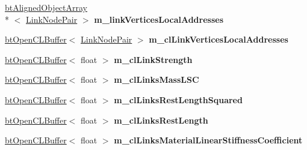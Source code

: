 \begin{DoxyCompactItemize}
\item 
\hypertarget{classbt_soft_body_link_data_open_c_l_s_i_m_d_aware_a5eb1278822cf10066651d3a363e18610}{\hyperlink{classbt_aligned_object_array}{bt\+Aligned\+Object\+Array}\\*
$<$ \hyperlink{classbt_soft_body_link_data_1_1_link_node_pair}{Link\+Node\+Pair} $>$ {\bfseries m\+\_\+link\+Vertices\+Local\+Addresses}}\label{classbt_soft_body_link_data_open_c_l_s_i_m_d_aware_a5eb1278822cf10066651d3a363e18610}

\item 
\hypertarget{classbt_soft_body_link_data_open_c_l_s_i_m_d_aware_a261ac09ba0b1b4a8d553f9d792e2e7cb}{\hyperlink{classbt_open_c_l_buffer}{bt\+Open\+C\+L\+Buffer}$<$ \hyperlink{classbt_soft_body_link_data_1_1_link_node_pair}{Link\+Node\+Pair} $>$ {\bfseries m\+\_\+cl\+Link\+Vertices\+Local\+Addresses}}\label{classbt_soft_body_link_data_open_c_l_s_i_m_d_aware_a261ac09ba0b1b4a8d553f9d792e2e7cb}

\item 
\hypertarget{classbt_soft_body_link_data_open_c_l_s_i_m_d_aware_ab9ed66c26778c06d79c091e350352ca8}{\hyperlink{classbt_open_c_l_buffer}{bt\+Open\+C\+L\+Buffer}$<$ float $>$ {\bfseries m\+\_\+cl\+Link\+Strength}}\label{classbt_soft_body_link_data_open_c_l_s_i_m_d_aware_ab9ed66c26778c06d79c091e350352ca8}

\item 
\hypertarget{classbt_soft_body_link_data_open_c_l_s_i_m_d_aware_a89ff42c1f39d0d00b86edce7d05179f1}{\hyperlink{classbt_open_c_l_buffer}{bt\+Open\+C\+L\+Buffer}$<$ float $>$ {\bfseries m\+\_\+cl\+Links\+Mass\+L\+S\+C}}\label{classbt_soft_body_link_data_open_c_l_s_i_m_d_aware_a89ff42c1f39d0d00b86edce7d05179f1}

\item 
\hypertarget{classbt_soft_body_link_data_open_c_l_s_i_m_d_aware_a03bf873ff26c4ec8079247d7ded5b285}{\hyperlink{classbt_open_c_l_buffer}{bt\+Open\+C\+L\+Buffer}$<$ float $>$ {\bfseries m\+\_\+cl\+Links\+Rest\+Length\+Squared}}\label{classbt_soft_body_link_data_open_c_l_s_i_m_d_aware_a03bf873ff26c4ec8079247d7ded5b285}

\item 
\hypertarget{classbt_soft_body_link_data_open_c_l_s_i_m_d_aware_ac63d137b2fef65daa39dc87691f23ce0}{\hyperlink{classbt_open_c_l_buffer}{bt\+Open\+C\+L\+Buffer}$<$ float $>$ {\bfseries m\+\_\+cl\+Links\+Rest\+Length}}\label{classbt_soft_body_link_data_open_c_l_s_i_m_d_aware_ac63d137b2fef65daa39dc87691f23ce0}

\item 
\hypertarget{classbt_soft_body_link_data_open_c_l_s_i_m_d_aware_a8f4b8cf03c9fa76ec283357df869fac1}{\hyperlink{classbt_open_c_l_buffer}{bt\+Open\+C\+L\+Buffer}$<$ float $>$ {\bfseries m\+\_\+cl\+Links\+Material\+Linear\+Stiffness\+Coefficient}}\label{classbt_soft_body_link_data_open_c_l_s_i_m_d_aware_a8f4b8cf03c9fa76ec283357df869fac1}


\end{DoxyCompactItemize}
